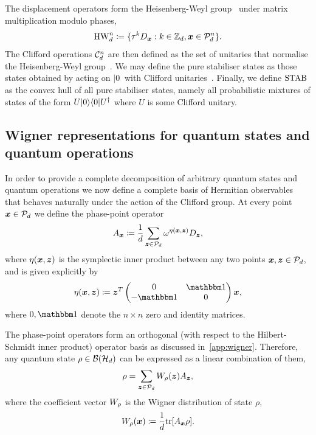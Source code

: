 \documentclass[pra,
aps,
twocolumn,
superscriptaddress,
groupedaddress,
nofootinbib,
reprint
]{revtex4-1}
\begin{document}
The displacement operators form the Heisenberg-Weyl group~\cite{Folland_1989, Bengtsson_2006} under matrix multiplication modulo phases,
\begin{equation}\label{eq:gp}
    {\rm{HW}}_d^n \coloneqq \{ \tau^k D_{\bmx}: k \in \mathbb{Z}_d, \bmx \in \cal{P}_d^n\}.
\end{equation}
The Clifford operations $ \cal{C}_d^n $ are then defined as the set of unitaries that normalise the Heisenberg-Weyl group~\cite{Appleby_2005}. We may define the pure stabiliser states as those states obtained by acting on $|0\>$ with Clifford unitaries~\cite{cit:gross3}. Finally, we define $\stab$ as the convex hull of all pure stabiliser states, namely all probabilistic mixtures of states of the form $U|0\>\<0|U^\dagger$ where $U$ is some Clifford unitary. 

\subsection{Wigner representations for quantum states and quantum operations}\label{sec:wigner}

In order to provide a complete decomposition of arbitrary quantum states and quantum operations we now define a complete basis of Hermitian observables that behaves naturally under the action of the Clifford group. At every point $\x \in \P_d$ we define the phase-point operator
\begin{equation}\label{eq:ax}
	A_{\bmx} \coloneqq \frac{1}{d} \sum_{\bmz \in \cal{P}_d} \omega^{\eta(\bmx, \bmz)} D_{\bmz}, 
\end{equation}
where $\eta(\bmx, \bmz)$ is the symplectic inner product between any two points $\x,\z \in \P_d$, and is given explicitly by
\begin{equation}
	\eta(\bmx, \bmz) \coloneqq \bmz^T \begin{pmatrix}
		0  & \id \\ %
		-\id & 0 \\ %
	\end{pmatrix} \bmx,
\end{equation}
where $0, \id$ denote the $n\times n$ zero and identity matrices.

The phase-point operators form an orthogonal (with respect to the Hilbert-Schmidt inner product) operator basis as discussed in~\cref{app:wigner}.
Therefore, any quantum state $\rho \in \cal{B}(\cal{H}_d)$ can be expressed as a linear combination of them,
\begin{equation}
    \rho = \sum_{\bmz \in \cal{P}_d} \W[\bmz]{\rho} A_{\bmz},
\end{equation}
where the coefficient vector $\W{\rho}$ is the Wigner distribution of state $\rho$,
\begin{equation}\label{eq:wstate}
    \W[\bmx]{\rho} \coloneqq \frac{1}{d}\tr[A_{\bmx} \rho].
\end{equation}
\end{document}
